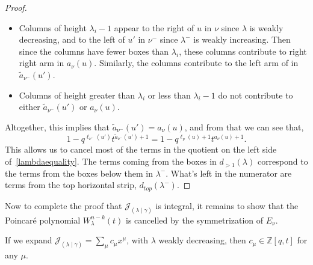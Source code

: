 \documentclass[ALCO]{cedram}
\newcommand{\Z}{\mathbb{Z}}
\newcommand{\JJ}{\mathcal{J}_{(\lambda \mid \gamma)}}
\newcommand{\numin}{{\nu^-}}
\begin{document}
\begin{proof}
\begin{itemize}
\item Columns of height $\lambda_i-1$ appear to the right of $u$ in $\nu$ since $\lambda$ is weakly decreasing, and to the left of $u'$ in $\numin$ since $\lambda^-$ is weakly increasing. Then since the columns have fewer boxes than $\lambda_i$, these columns contribute to right right arm in $a_\nu(u)$. Similarly, the columns contribute to the left arm of in~$\widetilde{a}_\numin(u')$.

\item Columns of height greater than $\lambda_i$ or less than $\lambda_i-1$ do not contribute to either $\widetilde{a}_\numin(u')$ or $a_\nu(u)$.


\end{itemize}
Altogether, this implies that $\widetilde{a}_\numin(u') = a_\nu(u)$, and from that we can see that, \[1-q^{\ell_\numin(u')}t^{\widetilde{a}_\numin(u') + 1} = 1-q^{\ell_\nu(u)+1}t^{a_\nu(u) +1}.\]
This allows us to cancel most of the terms in the quotient on the left side of~\eqref{lambdaequality}. The terms coming from the boxes in $d_{>1}(\lambda)$ correspond to the terms from the boxes below them in $\lambda^-$. What's left in the numerator are terms from the top horizontal strip, $d_{top}(\lambda^-)$.
\end{proof}

Now to complete the proof that $\JJ$ is integral, it remains to show that the Poincar\'e polynomial $W^{n-k}_\lambda(t)$ is cancelled by the symmetrization of $E_\nu$.

\begin{thm}\label{Integrality}
If we expand $\displaystyle{\JJ = \sum_\mu c_{ \mu} x^\mu}$, with $\lambda$ weakly decreasing, then \mbox{$c_{ \mu} \in \Z[q,t]$} for any $\mu$.
\end{thm}
\end{document}
